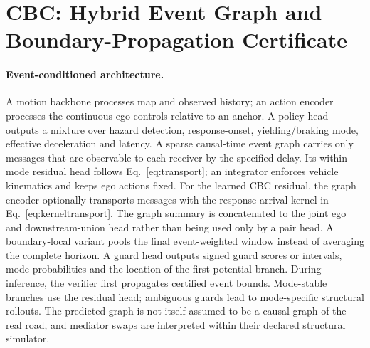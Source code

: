 \documentclass[10pt]{article}
\begin{document}
\section{CBC: Hybrid Event Graph and Boundary-Propagation Certificate}
\label{app:cbcimpl}
\paragraph{Event-conditioned architecture.}
A motion backbone processes map and observed history; an action encoder processes the continuous ego controls relative to an anchor. A policy head outputs a mixture over hazard detection, response-onset, yielding/braking mode, effective deceleration and latency. A sparse causal-time event graph carries only messages that are observable to each receiver by the specified delay. Its within-mode residual head follows Eq.~\eqref{eq:transport}; an integrator enforces vehicle kinematics and keeps ego actions fixed. For the learned CBC residual, the graph encoder optionally transports messages with the response-arrival kernel in Eq.~\eqref{eq:kerneltransport}. The graph summary is concatenated to the joint ego and downstream-union head rather than being used only by a pair head. A boundary-local variant pools the final event-weighted window instead of averaging the complete horizon. A guard head outputs signed guard scores or intervals, mode probabilities and the location of the first potential branch. During inference, the verifier first propagates certified event bounds. Mode-stable branches use the residual head; ambiguous guards lead to mode-specific structural rollouts. The predicted graph is not itself assumed to be a causal graph of the real road, and mediator swaps are interpreted within their declared structural simulator.
\end{document}
